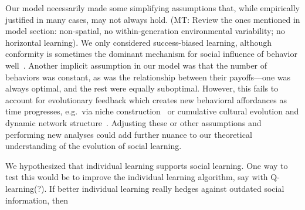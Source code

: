 \documentclass[letterpaper,11.5pt]{scrartcl}
\newcommand{\mt}[1]{{\textcolor{myorange} {({\tiny MT:} #1)}}}
\begin{document}
Our model necessarily made some simplifying assumptions that, while
empirically justified in many cases, may not always hold.
\mt{Review the ones mentioned in model section: non-spatial, no within-generation
environmental variability; no horizontal learning}.
We only considered
success-biased learning, although conformity is sometimes the dominant mechanism 
for social influence of behavior well~\cite{Muthukrishna2016a,Smaldino2018b}. 
Another implicit assumption
in our model was that the number of behaviors was constant, as was the relationship
between their payoffs---one was always optimal, and the rest were equally
suboptimal. However, this fails to account for evolutionary feedback which creates
new behavioral affordances as time progresses, e.g.\ via niche 
construction~\cite{Smaldino2012,Heras-Escribano2020} or cumulative cultural
evolution and dynamic network structure~\cite{Smolla2019,Derex2020}. 
Adjusting these or other assumptions and performing new analyses could
add further nuance to our theoretical understanding of the evolution of social learning.

We hypothesized that individual learning supports social learning. One way to 
test this would be to improve the individual learning algorithm, say with Q-learning(?).
If better individual learning really hedges against outdated social information,
then 

\end{document}
